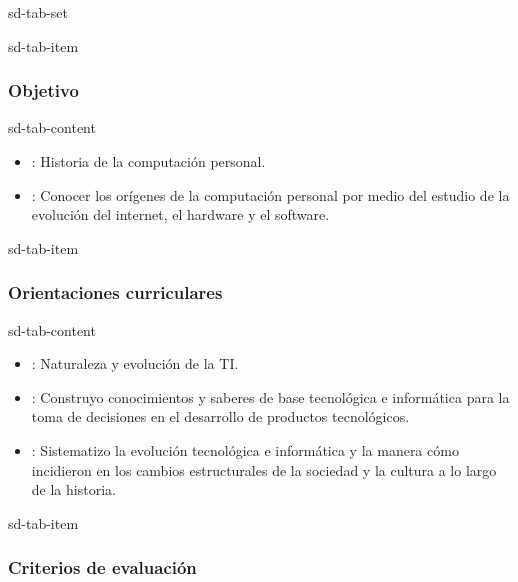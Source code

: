 \documentclass[letterpaper,10pt,spanish]{sphinxmanual}
\begin{document}
\begin{sphinxuseclass}{sd-tab-set}
\begin{sphinxuseclass}{sd-tab-item}\subsubsection*{Objetivo}

\begin{sphinxuseclass}{sd-tab-content}\begin{itemize}
\item {} 
\sphinxAtStartPar
{}: Historia de la computación personal.

\item {} 
\sphinxAtStartPar
{}: Conocer los orígenes de la computación personal por medio del estudio de la evolución del internet, el hardware y el software.

\end{itemize}

\end{sphinxuseclass}
\end{sphinxuseclass}
\begin{sphinxuseclass}{sd-tab-item}\subsubsection*{Orientaciones curriculares}

\begin{sphinxuseclass}{sd-tab-content}\begin{itemize}
\item {} 
\sphinxAtStartPar
{}: Naturaleza y evolución de la TI.

\item {} 
\sphinxAtStartPar
{}: Construyo conocimientos y saberes de base tecnológica e informática para la toma de decisiones en el desarrollo de productos tecnológicos.

\item {} 
\sphinxAtStartPar
{}: Sistematizo la evolución tecnológica e informática y la manera cómo incidieron en los cambios estructurales de la sociedad y la cultura a lo largo de la historia.

\end{itemize}

\end{sphinxuseclass}
\end{sphinxuseclass}
\begin{sphinxuseclass}{sd-tab-item}\subsubsection*{Criterios de evaluación}


\end{sphinxuseclass}
\end{sphinxuseclass}
\end{document}
